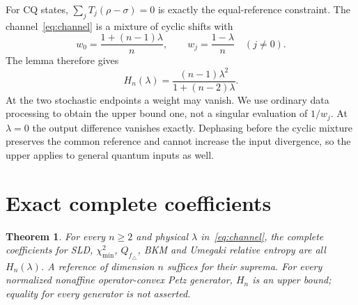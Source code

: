 \documentclass[11pt]{article}
\newtheorem{theorem}{Theorem}[section]
\theoremstyle{remark}\newtheorem{remark}[theorem]{Remark}
\begin{document}
For CQ states, $\sum_jT_j(\rho-\sigma)=0$ is exactly the equal-reference constraint. The channel~\eqref{eq:channel} is a mixture of cyclic shifts with
\[
 w_0=\frac{1+(n-1)\lambda}{n},\qquad
 w_j=\frac{1-\lambda}{n}\quad(j\ne0).
\]
The lemma therefore gives
\begin{equation}\label{eq:H}
 H_n(\lambda)=\frac{(n-1)\lambda^2}{1+(n-2)\lambda}.
\end{equation}
At the two stochastic endpoints a weight may vanish. We use ordinary data processing to obtain the upper bound one, not a singular evaluation of $1/w_j$. At $\lambda=0$ the output difference vanishes exactly. Dephasing before the cyclic mixture preserves the common reference and cannot increase the input divergence, so the upper applies to general quantum inputs as well.

\section{Exact complete coefficients}
\begin{theorem}\label{thm:exact}
For every $n\geq2$ and physical $\lambda$ in~\eqref{eq:channel}, the complete coefficients for SLD, $\chi_{\min}^2$, $Q_{f_\triangle}$, BKM and Umegaki relative entropy are all $H_n(\lambda)$. A reference of dimension $n$ suffices for their suprema. For every normalized nonaffine operator-convex Petz generator, $H_n$ is an upper bound; equality for every generator is not asserted.
\end{theorem}
\end{document}
